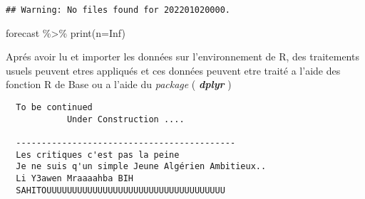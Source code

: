 \documentclass[
]{article}
\newenvironment{Shaded}{\begin{snugshade}}{\end{snugshade}}
\newcommand{\AttributeTok}[1]{\textcolor[rgb]{0.77,0.63,0.00}{#1}}
\newcommand{\ConstantTok}[1]{\textcolor[rgb]{0.00,0.00,0.00}{#1}}
\newcommand{\FunctionTok}[1]{\textcolor[rgb]{0.00,0.00,0.00}{#1}}
\newcommand{\NormalTok}[1]{#1}
\newcommand{\SpecialCharTok}[1]{\textcolor[rgb]{0.00,0.00,0.00}{#1}}
\begin{document}
\begin{verbatim}
## Warning: No files found for 202201020000.
\end{verbatim}

\begin{Shaded}
\begin{Highlighting}[]
\NormalTok{forecast }\SpecialCharTok{\%\textgreater{}\%} \FunctionTok{print}\NormalTok{(}\AttributeTok{n=}\ConstantTok{Inf}\NormalTok{)}
\end{Highlighting}
\end{Shaded}

Aprés avoir lu et importer les données sur l'environnement de R, des
traitements usuels peuvent etres appliqués et ces données peuvent etre
traité a l'aide des fonction R de Base ou a l'aide du \emph{package} (
\textbf{\emph{dplyr}} )

\begin{verbatim}
  To be continued
            Under Construction .... 
            
  -------------------------------------------          
  Les critiques c'est pas la peine 
  Je ne suis q'un simple Jeune Algérien Ambitieux..
  Li Y3awen Mraaaahba BIH
  SAHITOUUUUUUUUUUUUUUUUUUUUUUUUUUUUUUUUUUU
\end{verbatim}
\end{document}
